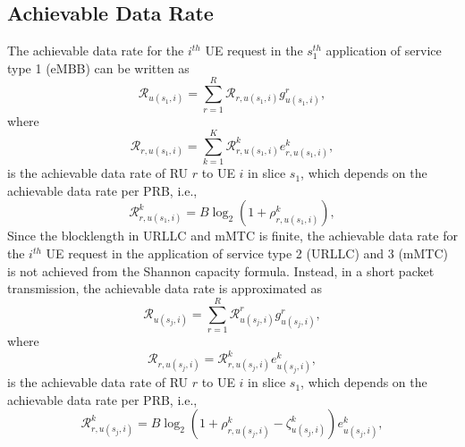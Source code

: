 \documentclass[lettersize,journal]{IEEEtran}
\begin{document}
\subsection{Achievable Data Rate}
The achievable data rate for the $i^{th}$ UE request in the $s_{1}^{th}$ application of service type 1 (eMBB) can be written as 
\begin{equation}\label{eq3}
\mathcal{R}_{u(s_1,i)} = \sum_{r=1}^{R}\mathcal{R}_{r,u(s_1,i)} g^r_{u(s_1,i)},
\end{equation}
where
\begin{equation}
\mathcal{R}_{r, u(s_1,i)} = \sum_{k=1}^{K} \mathcal{{R}}_{r,u(s_1,i)}^{k} e^k_{r,u(s_1,i)},
\end{equation}
is the achievable data rate of RU $r$ to UE $i$ in slice $s_1$, which depends on the achievable data rate per PRB, i.e.,
\begin{equation}
\mathcal{{R}}_{r,u(s_1,i)}^{k} =  B \log_2({1+ \rho_{r,u(s_1,i)}^{k}}),
\end{equation}
Since the blocklength in URLLC and mMTC is finite, the achievable data rate for the $i^{th}$ UE request in the application of service type 2 (URLLC) and 3 (mMTC) is not achieved from the Shannon capacity formula. Instead, in a short packet transmission, the achievable data rate is approximated as \cite{setayesh2020joint}
\begin{equation}\label{eq11}
\mathcal{R}_{u(s_j,i)} = \sum_{r=1}^{R}\mathcal{R}_{u(s_j,i)}^{r} g^r_{u(s_j,i)},
\end{equation}
where
\begin{equation}
\mathcal{R}_{r,u(s_j,i)} = \mathcal{{R}}_{r,u(s_j,i)}^{k}{e}_{u(s_j,i)}^{k},
\end{equation}
is the achievable data rate of RU $r$ to UE $i$ in slice $s_1$, which depends on the achievable data rate per PRB, i.e.,
\begin{equation}
\mathcal{{R}}_{r,u(s_j,i)}^{k} = B \log_2({1+ \rho_{r,u(s_j,i)}^{k}} - \zeta_{u(s_j,i)}^{k}){e}_{u(s_j,i)}^{k},
\end{equation}
\end{document}

